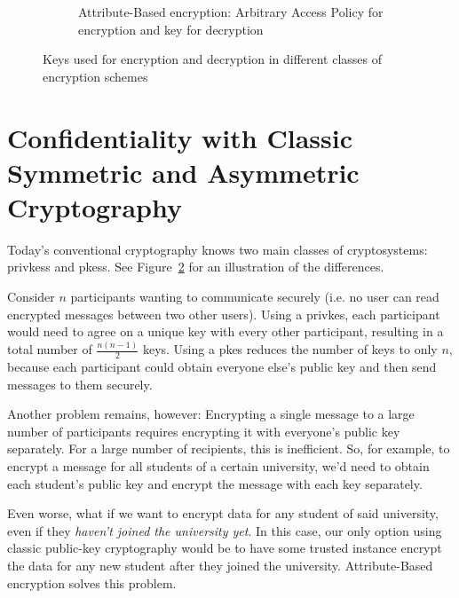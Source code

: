 \begin{figure}
\begin{subfigure}{.8\textwidth}
        \caption{Attribute-Based encryption: Arbitrary Access Policy for encryption and key for decryption} \label{fig:keys-abe}
    \end{subfigure}
    \caption[Keys in different classes of encryption schemes]{Keys used for encryption and decryption in different classes of encryption schemes}
    \label{fig:key-use}
\end{figure}

\section{Confidentiality with Classic Symmetric and Asymmetric Cryptography}
Today's conventional cryptography knows two main classes of cryptosystems: \glspl{privkes} and \glspl{pkes}. See Figure~\ref{fig:key-use} for an illustration of the differences.

Consider $n$ participants wanting to communicate securely (i.e. no user can read encrypted messages between two other users).
Using a \gls{privkes}, each participant would need to agree on a unique key with every other participant, resulting in a total number of $\frac{n(n-1)}{2}$ keys.
Using a \gls{pkes} reduces the number of keys to only $n$, because each participant could obtain everyone else's public key and then send messages to them securely.

Another problem remains, however: Encrypting a single message to a large number of participants requires encrypting it with everyone's public key separately.
For a large number of recipients, this is inefficient.
So, for example, to encrypt a message for all students of a certain university, we'd need to obtain each student's public key and encrypt the message with each key separately.

Even worse, what if we want to encrypt data for any student of said university, even if they \emph{haven't joined the university yet}.
In this case, our only option using classic public-key cryptography would be to have some trusted instance encrypt the data for any new student after they joined the university.
Attribute-Based encryption solves this problem.

